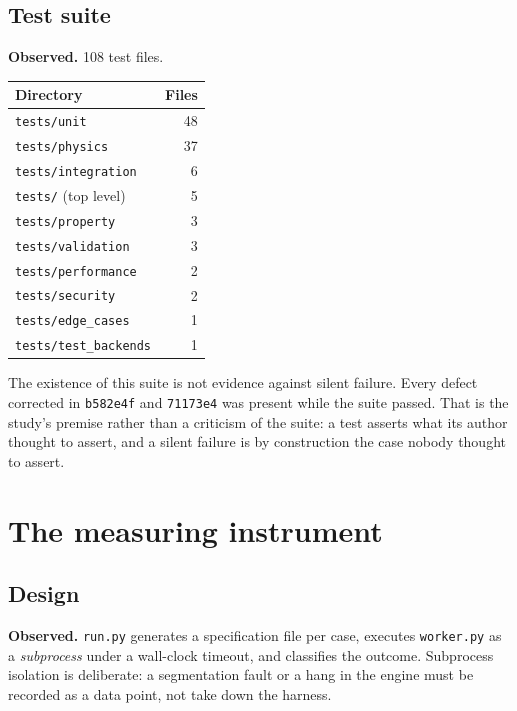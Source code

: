 \documentclass[11pt,a4paper]{article}
\newcommand{\gitsha}[1]{\texttt{#1}}
\begin{document}
\subsection{Test suite}

\noindent\textbf{Observed.} 108 test files.

\begin{center}
\begin{tabular}{@{}lr@{}}
\toprule
\textbf{Directory} & \textbf{Files} \\
\midrule
\texttt{tests/unit}           & 48 \\
\texttt{tests/physics}        & 37 \\
\texttt{tests/integration}    & 6 \\
\texttt{tests/} (top level)   & 5 \\
\texttt{tests/property}       & 3 \\
\texttt{tests/validation}     & 3 \\
\texttt{tests/performance}    & 2 \\
\texttt{tests/security}       & 2 \\
\texttt{tests/edge\_cases}    & 1 \\
\texttt{tests/test\_backends} & 1 \\
\bottomrule
\end{tabular}
\end{center}

\noindent The existence of this suite is not evidence against silent failure.
Every defect corrected in \gitsha{b582e4f} and \gitsha{71173e4} was present
while the suite passed. That is the study's premise rather than a criticism of
the suite: a test asserts what its author thought to assert, and a silent
failure is by construction the case nobody thought to assert.

\section{The measuring instrument}\label{sec:instrument}

\subsection{Design}

\noindent\textbf{Observed.} \texttt{run.py} generates a specification file per
case, executes \texttt{worker.py} as a \emph{subprocess} under a wall-clock
timeout, and classifies the outcome. Subprocess isolation is deliberate: a
segmentation fault or a hang in the engine must be recorded as a data point,
not take down the harness.
\end{document}
